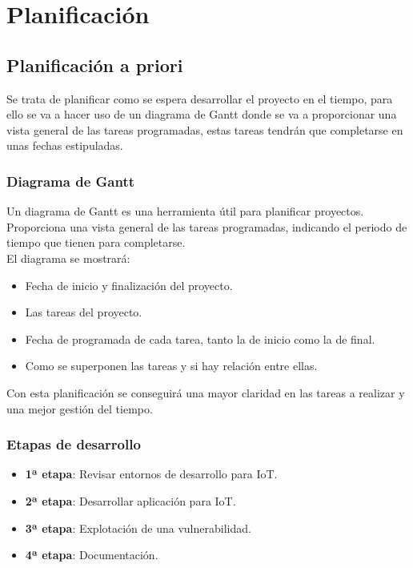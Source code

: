 \chapter{Planificación}

\section{Planificación a priori}

Se trata de planificar como se espera desarrollar el proyecto en el tiempo, para ello se va a hacer uso de un diagrama de Gantt donde se va a proporcionar una vista general de las tareas programadas, estas tareas tendrán que completarse en unas fechas estipuladas.

\subsection{Diagrama de Gantt}

Un diagrama de Gantt es una herramienta útil para planificar proyectos. Proporciona una vista general de las tareas programadas, indicando el periodo de tiempo que tienen para completarse.\\

El diagrama se mostrará:
\begin{itemize}
    \item Fecha de inicio y finalización del proyecto.
    \item Las tareas del proyecto.
    \item Fecha de programada de cada tarea, tanto la de inicio como la de final.
    \item Como se superponen las tareas y si hay relación entre ellas.
\end{itemize}

Con esta planificación se conseguirá una mayor claridad en las tareas a realizar y una mejor gestión del tiempo.

\subsection{Etapas de desarrollo}

\begin{itemize}
    \item \textbf{1ª etapa}: Revisar entornos de desarrollo para IoT.
    \item \textbf{2ª etapa}: Desarrollar aplicación para IoT.
    \item \textbf{3ª etapa}: Explotación de una vulnerabilidad.
    \item \textbf{4ª etapa}: Documentación.
\end{itemize}

